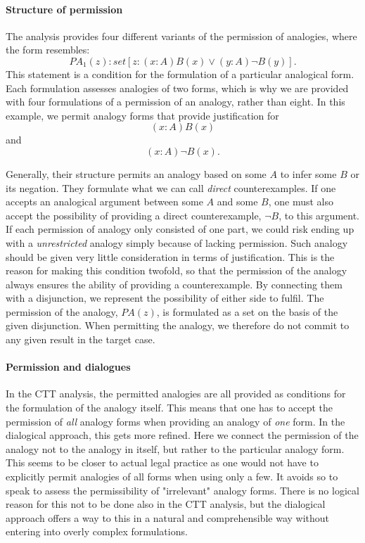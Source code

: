 				\paragraph{Structure of permission}
				
				The analysis provides four different variants of the permission of analogies, where the form resembles:
					\[
			 			PA_1(z) : set [z : (x : A)B(x) \lor (y : A) \neg B(y)]. 
			 		\]
				This statement is a condition for the formulation of a particular analogical form. Each formulation assesses analogies of two forms, which is why we are provided with four formulations of a permission of an analogy, rather than eight. In this example, we permit analogy forms that provide justification for
					\[
						(x : A)B(x) 
					\]
					and
					\[
						(x : A)\neg B(x).
					\]
				
				Generally, their structure permits an analogy based on some $A$ to infer some $B$ or its negation. They formulate what we can call \textit{direct} counterexamples. If one accepts an analogical argument between some $A$ and some $B$, one must also accept the possibility of providing a direct counterexample, $\neg B$, to this argument. If each permission of analogy only consisted of one part, we could risk ending up with a \textit{unrestricted} analogy simply because of lacking permission. Such analogy should be given very little consideration in terms of justification. This is the reason for making this condition twofold, so that the permission of the analogy always ensures the ability of providing a counterexample. By connecting them with a disjunction, we represent the possibility of either side to fulfil. The permission of the analogy, $PA(z)$, is formulated as a set on the basis of the given disjunction. When permitting the analogy, we therefore do not commit to any given result in the target case. 
				
				\paragraph{Permission and dialogues}
				
				In the CTT analysis, the permitted analogies are all provided as conditions for the formulation of the analogy itself. This means that one has to accept the permission of \textit{all} analogy forms when providing an analogy of \textit{one} form. In the dialogical approach, this gets more refined. Here we connect the permission of the analogy not to the analogy in itself, but rather to the particular analogy form. This seems to be closer to actual legal practice as one would not have to explicitly permit analogies of all forms when using only a few. It avoids so to speak to assess the permissibility of "irrelevant" analogy forms. There is no logical reason for this not to be done also in the CTT analysis, but the dialogical approach offers a way to this in a natural and comprehensible way without entering into overly complex formulations. 
				
